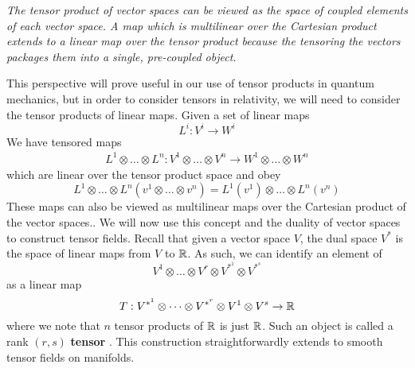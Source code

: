      \begin{concept}
     \textit{The tensor product of vector spaces can be viewed as the space of coupled elements of each vector space.  A map which is multilinear over the Cartesian product extends to a linear map over the tensor product because the tensoring the vectors packages them into a single, pre-coupled object.}
     \end{concept}
This perspective will prove useful in our use of tensor products in quantum mechanics, but in order to consider tensors in relativity, we will need to consider the tensor products of linear maps.  Given a set of linear maps 
   \begin{equation*}
   	L^i: V^i\to W^i
   \end{equation*}  
   We have tensored maps 
   \begin{align*}
   	L^1 \otimes \dots \otimes L^n: V^1 \otimes \dots \otimes V^n \to W^1 \otimes \dots \otimes W^n
   \end{align*}
   which are linear over the tensor product space and obey 
   \begin{equation*}
   	L^1 \otimes \dots \otimes L^n(v^1\otimes\dots \otimes v^n) = L^1(v^1) \otimes \dots \otimes L^n(v^n)
   \end{equation*}
   These maps can also be viewed as multilinear maps over the Cartesian product of the vector spaces..  We will now use this concept and the duality of vector spaces to construct tensor fields.  Recall that given a vector space $V$, the dual space $V^*$ is the space of linear maps from $V$ to $\mathbb{R}$.  As such, we can identify an element of 
   \begin{equation*}
   	V^1\otimes \dots \otimes V^r\otimes V^{*^1}\otimes V^{*^s}
   \end{equation*}
   as a linear map 
   \begin{equation*}
   	T: V^{*^1}\otimes \dots \otimes V^{*^r}\otimes V^1\otimes V^s \to \mathbb{R}
   \end{equation*}
   where we note that $n$ tensor products of $\mathbb{R}$ is just $\mathbb{R}$.  Such an object is called a rank $(r, s)$ \textbf{tensor} .  This construction straightforwardly extends to smooth tensor fields on manifolds.\\
   
